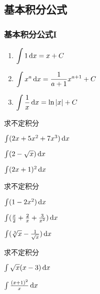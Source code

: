 \documentclass[14pt,notheorems,leqno,xcolor={rgb}]{beamer} %
\begin{document}
\subsection{基本积分公式}

\newcommand{\seti}{\setcounter{saveenumi}{\value{enumi}}}
\newcommand{\conti}{\setcounter{enumi}{\value{saveenumi}}}

\begin{frame}[label=intformula1]
\frametitle{基本积分公式I}
\begin{enumerate}[<+->]
  \item $\displaystyle\int 1\mathop{}\!\mathrm{d}{x} = x+C$
  \item $\displaystyle\int x^a \mathop{}\!\mathrm{d}{x} = \frac{1}{a+1}x^{a+1}+C$
  \item $\displaystyle\int \frac1x \mathop{}\!\mathrm{d}{x} = \ln|x|+C$
  \seti
\end{enumerate}
\end{frame}

\begin{frame}
\begin{example}
求不定积分
\begin{enumlite}
\item $\int (2x+5x^2+7x^3) \mathop{}\!\mathrm{d}{x}$
\item $\int (2-\sqrt{x}) \mathop{}\!\mathrm{d}{x}$
\item $\int (2x+1)^2 \mathop{}\!\mathrm{d}{x}$
\end{enumlite}
\end{example}
\end{frame}

\begin{frame}
\begin{exercise}
求不定积分
\begin{enumlite}
  \item $\int (1-2x^2) \mathop{}\!\mathrm{d}{x}$
  \item $\int (\frac{x}2+\frac2{x}+\frac3{x^2})\mathop{}\!\mathrm{d}{x}$
  \pause
  \item $\int (\sqrt[3]{x}-\frac1{\sqrt{x}})\mathop{}\!\mathrm{d}{x}$
\end{enumlite}
\end{exercise}
\end{frame}

\begin{frame}
\begin{exercise}
求不定积分
\begin{enumlite}
  \item $\int \sqrt{x}(x-3) \mathop{}\!\mathrm{d}{x}$
  \item $\int \frac{(x+1)^2}{x}\mathop{}\!\mathrm{d}{x}$
\end{enumlite}
\end{exercise}
\end{frame}
\end{document}

